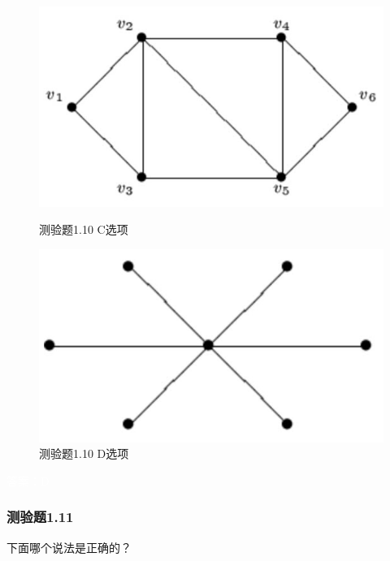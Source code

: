 \documentclass[UTF8, heading=true]{ctexart}
\begin{document}
\begin{figure}[H]
\centering
\begin{minipage}[t]{0.35\textwidth}
    \centering
    \includegraphics[width=1\textwidth]{1.10_3.jpg} %
    \caption{测验题1.10 C选项}
\end{minipage}
  \hspace{0.1\textwidth} %
\begin{minipage}[t]{0.35\textwidth}
    \centering
    \includegraphics[width=1\textwidth]{1.10_4.jpg} %
    \caption{测验题1.10 D选项}
\end{minipage}
\end{figure}

\textcolor{white}{答案：D}



\subsubsection{测验题1.11}

下面哪个说法是正确的？
\end{document}
